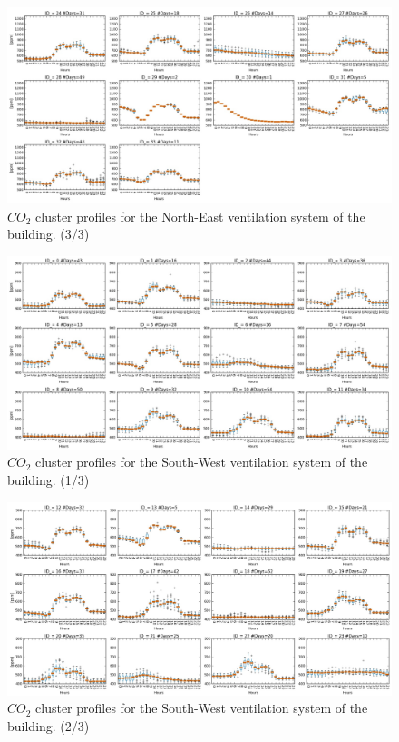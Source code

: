 \begin{landscape}
\begin{figure}[h!]
  \vspace{0.5em} %
  \includegraphics[scale=0.6]{Figures/candidates_CO2_NE_3.jpg}
  \caption{$CO_2$ cluster profiles for the North-East ventilation system of the building. (3/3) }
  \label{fig:candidates_profiles_NE}
\end{figure}


\begin{figure}[h!]
  \vspace{0.5em} %
  \includegraphics[scale=0.6]{Figures/candidates_CO2_SW_1.jpg}
  \caption{$CO_2$ cluster profiles for the South-West ventilation system of the building. (1/3) }
  \label{fig:candidates_profiles_SW}
\end{figure}

\begin{figure}[h!]
  \vspace{0.5em} %
  \includegraphics[scale=0.6]{Figures/candidates_CO2_SW_2.jpg}
  \caption{$CO_2$ cluster profiles for the South-West ventilation system of the building. (2/3) }
  \label{fig:candidates_profiles_SW}
\end{figure}


\end{landscape}
